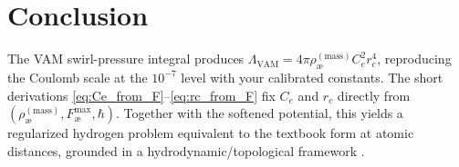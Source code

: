 \documentclass[12pt]{article}
\newcommand{\aeRhoM}{\rho_{\text{\ae}}^{(\text{mass})}}
\newcommand{\Ce}{C_e}
\newcommand{\rc}{r_c}
\newcommand{\Lam}{\Lambda_{\text{VAM}}}
\begin{document}
    \section{Conclusion}
    The VAM swirl-pressure integral produces \(\Lam=4\pi\aeRhoM \Ce^2 \rc^4\), reproducing the Coulomb scale at the \(10^{-7}\) level with your calibrated constants. The short derivations \eqref{eq:Ce_from_F}--\eqref{eq:rc_from_F} fix \(\Ce\) and \(\rc\) directly from \((\aeRhoM,F_{\text{\ae}}^{\max},\hbar)\). Together with the softened potential, this yields a regularized hydrogen problem equivalent to the textbook form at atomic distances, grounded in a hydrodynamic/topological framework \cite{Madelung1927,Pati2000,Sbitnev2015,Ranada1995,Kiehn2002,Barcelo2011,Bohm1952,Hiley2012,Helmholtz1858,Kelvin1867}.

    
    
\end{document}
